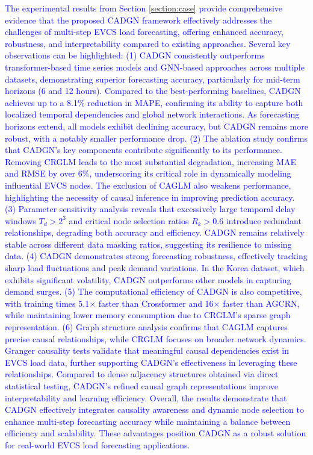 \documentclass[lettersize,journal]{IEEEtran}
\newcommand{\hl}[1]{\textcolor{blue}{#1}}
\begin{document}
\hl{The experimental results from Section \ref{section:case} provide comprehensive evidence that the proposed CADGN framework effectively addresses the challenges of multi-step EVCS load forecasting, offering enhanced accuracy, robustness, and interpretability compared to existing approaches. Several key observations can be highlighted:
(1) CADGN consistently outperforms transformer-based time series models and GNN-based approaches across multiple datasets, demonstrating superior forecasting accuracy, particularly for mid-term horizons (6 and 12 hours). Compared to the best-performing baselines, CADGN achieves up to a 8.1\% reduction in MAPE, confirming its ability to capture both localized temporal dependencies and global network interactions. As forecasting horizons extend, all models exhibit declining accuracy, but CADGN remains more robust, with a notably smaller performance drop. (2) The ablation study confirms that CADGN’s key components contribute significantly to its performance. Removing CRGLM leads to the most substantial degradation, increasing MAE and RMSE by over 6\%, underscoring its critical role in dynamically modeling influential EVCS nodes. The exclusion of CAGLM also weakens performance, highlighting the necessity of causal inference in improving prediction accuracy. (3) Parameter sensitivity analysis reveals that excessively large temporal delay windows $ T_d > 2^3$ and critical node selection ratios $ R_k > 0.6 $ introduce redundant relationships, degrading both accuracy and efficiency. CADGN remains relatively stable across different data masking ratios, suggesting its resilience to missing data. (4) CADGN demonstrates strong forecasting robustness, effectively tracking sharp load fluctuations and peak demand variations. In the Korea dataset, which exhibits significant volatility, CADGN outperforms other models in capturing demand surges. (5) The computational efficiency of CADGN is also competitive, with training times 5.1× faster than Crossformer and 16× faster than AGCRN, while maintaining lower memory consumption due to CRGLM’s sparse graph representation. (6) Graph structure analysis confirms that CAGLM captures precise causal relationships, while CRGLM focuses on broader network dynamics. Granger causality tests validate that meaningful causal dependencies exist in EVCS load data, further supporting CADGN’s effectiveness in leveraging these relationships. Compared to dense adjacency structures obtained via direct statistical testing, CADGN’s refined causal graph representations improve interpretability and learning efficiency.
Overall, the results demonstrate that CADGN effectively integrates causality awareness and dynamic node selection to enhance multi-step forecasting accuracy while maintaining a balance between efficiency and scalability. These advantages position CADGN as a robust solution for real-world EVCS load forecasting applications.}
\end{document}
